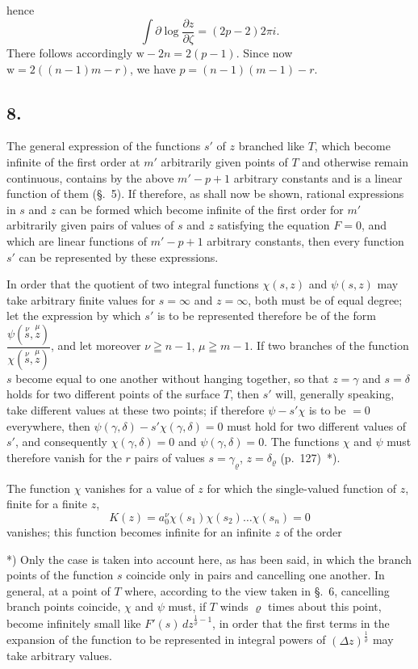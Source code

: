\documentclass{article}
\begin{document}
hence
\[ \int \partial \log\frac{\partial z}{\partial\zeta} = (2p-2)2\pi i. \]
There follows accordingly $\mathrm{w} - 2n = 2(p-1)$. Since now $\mathrm{w} = 2((n-1)m-r)$, we have $p = (n-1)(m-1) - r$.

\subsection*{8.}

The general expression of the functions $s'$ of $z$ branched like $T$, which become infinite of the first order at $m'$ arbitrarily given points of $T$ and otherwise remain continuous, contains by the above $m'-p+1$ arbitrary constants and is a linear function of them (§.~5). If therefore, as shall now be shown, rational expressions in $s$ and $z$ can be formed which become infinite of the first order for $m'$ arbitrarily given pairs of values of $s$ and $z$ satisfying the equation $F = 0$, and which are linear functions of $m'-p+1$ arbitrary constants, then every function $s'$ can be represented by these expressions.

In order that the quotient of two integral functions $\chi(s, z)$ and $\psi(s, z)$ may take arbitrary finite values for $s = \infty$ and $z = \infty$, both must be of equal degree; let the expression by which $s'$ is to be represented therefore be of the form $\dfrac{\psi(\overset{\nu}{s}, \overset{\mu}{z})}{\chi(\overset{\nu}{s}, \overset{\mu}{z})}$, and let moreover $\nu \geqq n-1$, $\mu \geqq m-1$. If two branches of the function $s$ become equal to one another without hanging together, so that $z = \gamma$ and $s = \delta$ holds for two different points of the surface $T$, then $s'$ will, generally speaking, take different values at these two points; if therefore $\psi - s'\chi$ is to be $= 0$ everywhere, then $\psi(\gamma, \delta) - s'\chi(\gamma, \delta) = 0$ must hold for two different values of $s'$, and consequently $\chi(\gamma, \delta) = 0$ and $\psi(\gamma, \delta) = 0$. The functions $\chi$ and $\psi$ must therefore vanish for the $r$ pairs of values $s = \gamma_{\varrho}$, $z = \delta_{\varrho}$ (p.~127)~*).

The function $\chi$ vanishes for a value of $z$ for which the single-valued function of $z$, finite for a finite $z$,
\[ K(z) = a_{0}^{\nu} \chi(s_{1}) \chi(s_{2}) \ldots \chi(s_{n}) = 0 \]
vanishes; this function becomes infinite for an infinite $z$ of the order

*) Only the case is taken into account here, as has been said, in which the branch points of the function $s$ coincide only in pairs and cancelling one another. In general, at a point of $T$ where, according to the view taken in §.~6, cancelling branch points coincide, $\chi$ and $\psi$ must, if $T$ winds $\varrho$ times about this point, become infinitely small like $F'(s)\, dz^{\frac{1}{\varrho}-1}$, in order that the first terms in the expansion of the function to be represented in integral powers of $(\Delta z)^{\frac{1}{\varrho}}$ may take arbitrary values.
\end{document}
